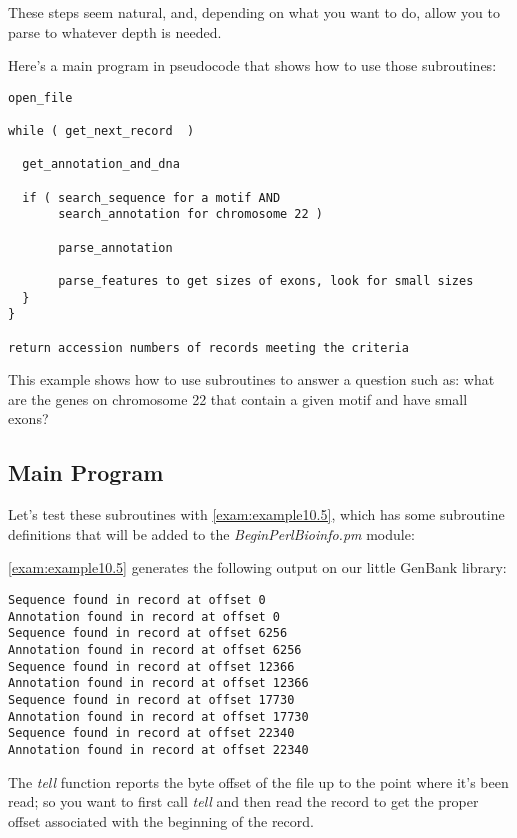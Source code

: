 These steps seem natural, and, depending on what you want to do, allow you to parse to whatever depth is needed.

Here's a main program in pseudocode that shows how to use those subroutines:

\begin{lstlisting}
open_file 

while ( get_next_record  )

  get_annotation_and_dna

  if ( search_sequence for a motif AND 
       search_annotation for chromosome 22 )

       parse_annotation

       parse_features to get sizes of exons, look for small sizes
  }
}

return accession numbers of records meeting the criteria
\end{lstlisting}

This example shows how to use subroutines to answer a question such as: what are the genes on chromosome 22 that contain a given motif and have small exons?
  
\subsection{Main Program}
Let's test these subroutines with \autoref{exam:example10.5}, which has some subroutine definitions that will be added to the \textit{BeginPerlBioinfo.pm} module:
  


\autoref{exam:example10.5} generates the following output on our little GenBank library:

\begin{lstlisting}
Sequence found in record at offset 0
Annotation found in record at offset 0
Sequence found in record at offset 6256
Annotation found in record at offset 6256
Sequence found in record at offset 12366
Annotation found in record at offset 12366
Sequence found in record at offset 17730
Annotation found in record at offset 17730
Sequence found in record at offset 22340
Annotation found in record at offset 22340
\end{lstlisting}

The \textit{tell} function reports the byte offset of the file up to the point where it's been read; so you want to first call \textit{tell} and then read the record to get the proper offset associated with the beginning of the record. 

